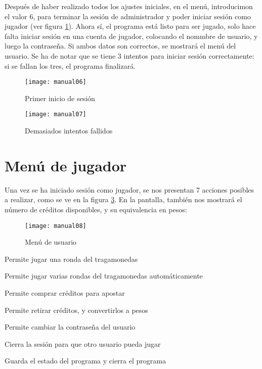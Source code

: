 \documentclass[titlepage,letterpaper,12pt]{article}
\begin{document}
Después de haber realizado todos los ajustes iniciales, en el menú, introducimon el valor 6, para terminar la sesión de administrador y poder iniciar sesión como jugador (ver figura \ref{fig:m6}). Ahora sí, el programa está listo para ser jugado, solo hace falta iniciar sesión en una cuenta de jugador, colocando el nommbre de usuario, y luego la contraseña. Si ambos datos son correctos, se mostrará el menú del usuario. Se ha de notar que se tiene 3 intentos para iniciar sesión correctamente: si se fallan los tres, el programa finalizará.

\begin{figure}
  \centering
  \texttt{[image: manual06]}
  \vspace{-1.5cm}
  \caption{Primer inicio de sesión}
  \label{fig:m6}
\end{figure}
\begin{figure}
  \centering
  \texttt{[image: manual07]}
  \vspace{-1.5cm}
  \caption{Demasiados intentos fallidos}
  \label{fig:m7}
\end{figure}

\section{Menú de jugador}
\label{jugador}
Una vez se ha iniciado sesión como jugador, se nos presentan 7 acciones posibles a realizar, como se ve en la figura \ref{fig:m8}. En la pantalla, también nos mostrará el número de créditos disponibles, y su equivalencia en pesos:

\begin{figure}
  \centering
  \texttt{[image: manual08]}
  \vspace{-1.5cm}
  \caption{Menú de usuario}
  \label{fig:m8}
\end{figure}

\begin{description}[style=nextline]
\item[Jugar (1)]
  Permite jugar una ronda del tragamonedas
\item[Jugar automáticamente (2)]
  Permite jugar varias rondas del tragamonedas automáticamente
\item[Depositar dinero (3)]
  Permite comprar créditos para apostar
\item[Retirar dinero (4)]
  Permite retirar créditos, y convertirlos a pesos
\item[Cambiar contraseña (5)]
  Permite cambiar la contraseña del usuario
\item[Cerrar sesión (6)]
  Cierra la sesión para que otro usuario pueda jugar
\item[Salir (0)]
  Guarda el estado del programa y cierra el programa
\end{description}
\end{document}
